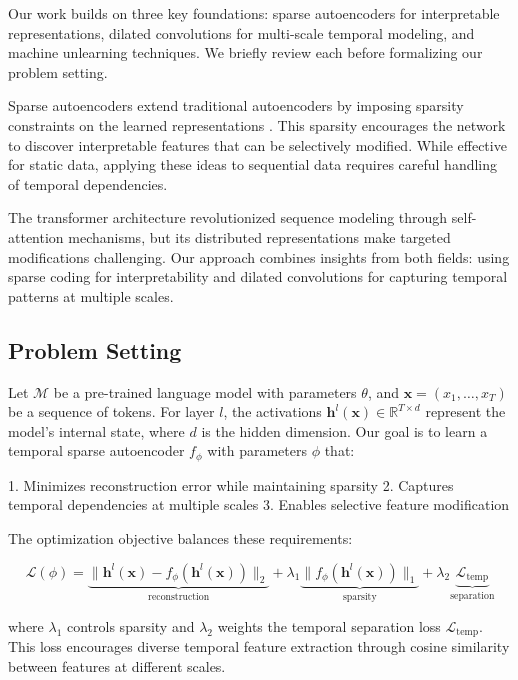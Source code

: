 \documentclass{article} %
\begin{document}
Our work builds on three key foundations: sparse autoencoders for interpretable representations, dilated convolutions for multi-scale temporal modeling, and machine unlearning techniques. We briefly review each before formalizing our problem setting.

Sparse autoencoders extend traditional autoencoders by imposing sparsity constraints on the learned representations \cite{goodfellow2016deep}. This sparsity encourages the network to discover interpretable features that can be selectively modified. While effective for static data, applying these ideas to sequential data requires careful handling of temporal dependencies.

The transformer architecture \cite{vaswani2017attention} revolutionized sequence modeling through self-attention mechanisms, but its distributed representations make targeted modifications challenging. Our approach combines insights from both fields: using sparse coding for interpretability and dilated convolutions for capturing temporal patterns at multiple scales.

\subsection{Problem Setting}
Let $\mathcal{M}$ be a pre-trained language model with parameters $\theta$, and $\mathbf{x} = (x_1, \ldots, x_T)$ be a sequence of tokens. For layer $l$, the activations $\mathbf{h}^l(\mathbf{x}) \in \mathbb{R}^{T \times d}$ represent the model's internal state, where $d$ is the hidden dimension. Our goal is to learn a temporal sparse autoencoder $f_{\phi}$ with parameters $\phi$ that:

1. Minimizes reconstruction error while maintaining sparsity
2. Captures temporal dependencies at multiple scales
3. Enables selective feature modification

The optimization objective balances these requirements:

\begin{equation}
\mathcal{L}(\phi) = \underbrace{\|\mathbf{h}^l(\mathbf{x}) - f_{\phi}(\mathbf{h}^l(\mathbf{x}))\|_2}_{\text{reconstruction}} + \lambda_1 \underbrace{\|f_{\phi}(\mathbf{h}^l(\mathbf{x}))\|_1}_{\text{sparsity}} + \lambda_2 \underbrace{\mathcal{L}_{\text{temp}}}_{\text{separation}}
\end{equation}

where $\lambda_1$ controls sparsity and $\lambda_2$ weights the temporal separation loss $\mathcal{L}_{\text{temp}}$. This loss encourages diverse temporal feature extraction through cosine similarity between features at different scales.
\end{document}
